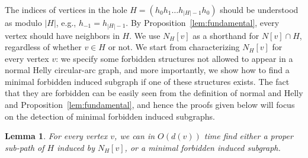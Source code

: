 \documentclass[10pt]{article}
\newtheorem{lemma}[theorem]{Lemma}
\newcommand{\badgraph}{minimal forbidden induced subgraph}
\newcommand{\nhcag}{normal Helly circular-arc graph}
\begin{document}
The indices of vertices in the hole $H = (h_0 h_1 \ldots h_{\vert
  H\vert-1} h_0)$ should be understood as modulo $|H|$, e.g., $h_{-1}
= h_{|H|-1}$.  By Proposition~\ref{lem:fundamental}, every vertex
should have neighbors in $H$.  We use $N_H[v]$ as a shorthand for
$N[v] \cap H$, regardless of whether $v \in H$ or not.  We start from
characterizing $N_H[v]$ for every vertex $v$: we specify some
forbidden structures not allowed to appear in a \nhcag, and more
importantly, we show how to find a minimal forbidden induced subgraph
if one of these structures exists.  The fact that they are forbidden
can be easily seen from the definition of normal and Helly and
Proposition~\ref{lem:fundamental}, and hence the proofs given below
will focus on the detection of \badgraph s.
\begin{lemma}\label{lem:non-consecutive}
  For every vertex $v$, we can in $O(d(v))$ time find either a proper
  sub-path of $H$ induced by $N_H[v]$, or a \badgraph.
\end{lemma}
\end{document}
